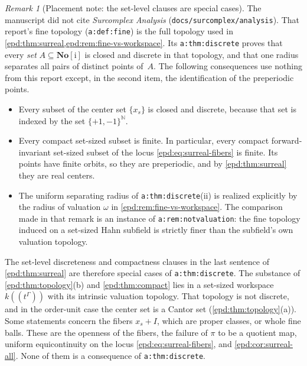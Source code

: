 \documentclass[11pt,a4paper]{article}
\numberwithin{equation}{section}
\theoremstyle{plain}
\theoremstyle{definition}
\theoremstyle{remark}
\newtheorem{remark}[remark]{Remark}
\newcommand{\No}{\mathbf{No}}
\newcommand{\N}{\mathbb N}
\begin{document}
\begin{remark}[Placement note: the set-level clauses are special cases]
\label{epd:rem:discrete-special}
The manuscript did not cite \emph{Surcomplex Analysis}
(\texttt{docs/surcomplex/analysis}). That report's fine topology
(\texttt{a:def:fine}) is the full topology used in
\cref{epd:thm:surreal,epd:rem:fine-vs-workspace}. Its \texttt{a:thm:discrete}
proves that every \emph{set} $A\subseteq\No[\mathrm i]$ is closed and
discrete in that topology, and that one radius separates all pairs of
distinct points of~$A$. The following consequences use nothing from this
report except, in the second item, the identification of the preperiodic
points.
\begin{itemize}[leftmargin=1.4em]
\item Every subset of the center set $\{x_s\}$ is closed and discrete,
because that set is indexed by the set $\{+1,-1\}^{\N}$.
\item Every compact set-sized subset is finite. In particular, every compact
forward-invariant set-sized subset of the locus \eqref{epd:eq:surreal-fibers}
is finite. Its points have finite orbits, so they are preperiodic, and by
\cref{epd:thm:surreal} they are real centers.
\item The uniform separating radius of \texttt{a:thm:discrete}(ii) is
realized explicitly by the radius of valuation $\omega$ in
\cref{epd:rem:fine-vs-workspace}. The
comparison made in that remark is an instance of
\texttt{a:rem:notvaluation}: the fine topology induced on a set-sized Hahn
subfield is strictly finer than the subfield's own valuation topology.
\end{itemize}
The set-level discreteness and compactness clauses in the last sentence of
\cref{epd:thm:surreal} are therefore special cases of
\texttt{a:thm:discrete}. The substance of \cref{epd:thm:topology}(b) and
\cref{epd:thm:compact} lies in a set-sized workspace $k((t^\Gamma))$ with
its intrinsic valuation topology. That topology is not discrete, and in the
order-unit case the center set is a Cantor set (\cref{epd:thm:topology}(a)). Some
statements concern the fibers $x_s+I$, which are proper classes, or whole
fine balls. These are the openness of the fibers, the failure of $\pi$ to
be a quotient map, uniform equicontinuity on the locus
\eqref{epd:eq:surreal-fibers}, and \cref{epd:cor:surreal-all}. None of them
is a consequence of \texttt{a:thm:discrete}.
\end{remark}
\end{document}
